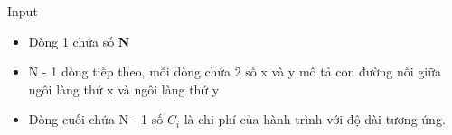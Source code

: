 Input
\begin{itemize}
	\item Dòng 1 chứa số \textbf{ N }
	\item N - 1 dòng tiếp theo, mỗi dòng chứa 2 số x và y mô tả con đường nối giữa ngôi làng thứ x và ngôi làng thứ y
	\item Dòng cuối chứa N - 1 số \textbf{ $C_{i}$} là chi phí của hành trình với độ dài tương ứng.
\end{itemize}